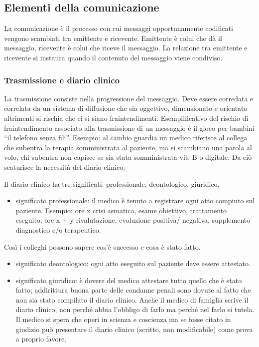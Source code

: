 \subsection{Elementi della comunicazione}

La comunicazione è il processo con cui messaggi opportunamente
codificati vengono scambiati tra emittente e ricevente. Emittente è
colui che dà il messaggio, ricevente è colui che riceve il messaggio. La
relazione tra emittente e ricevente si instaura quando il contenuto del
messaggio viene condiviso.

\subsubsection{Trasmissione e diario clinico}

La trasmissione consiste nella progressione del messaggio. Deve essere
corredata e correlata da un sistema di diffusione che sia oggettivo,
dimensionato e orientato altrimenti si rischia che ci si siano
fraintendimenti. Esemplificativo del rischio di fraintendimento
associato alla trasmissione di un messaggio è il gioco per bambini ``il
telefono senza fili''. Esempio: al cambio guardia un medico riferisce al
collega che subentra la terapia somministrata al paziente, ma si
scambiano una parola al volo, chi subentra non capisce se sia stata
somministrata vit. B o digitale. Da ciò scaturisce la necessità del
diario clinico.

Il diario clinico ha tre significati: professionale, deontologico,
giuridico.

\begin{itemize}
\item
  significato professionale: il medico è tenuto a registrare ogni atto
  compiuto sul paziente. Esempio: ore x crisi asmatica, esame obiettivo,
  trattamento eseguito; ore x + y rivalutazione, evoluzione positiva/
  negativa, supplemento diagnostico e/o terapeutico.
\end{itemize}

Così i colleghi possono sapere cos'è successo e cosa è stato fatto.

\begin{itemize}
\item
  significato deontologico: ogni atto eseguito sul paziente deve essere
  attestato.
\item
  significato giuridico: è dovere del medico attestare tutto quello che
  è stato fatto; addirittura buona parte delle condanne penali sono
  dovute al fatto che non sia stato compilato il diario clinico. Anche
  il medico di famiglia scrive il diario clinico, non perché abbia
  l'obbligo di farlo ma perché nel farlo si tutela. Il medico si spera
  che operi in scienza e coscienza ma se fosse citato in giudizio può
  presentare il diario clinico (scritto, non modificabile) come prova a
  proprio favore.
\end{itemize}

